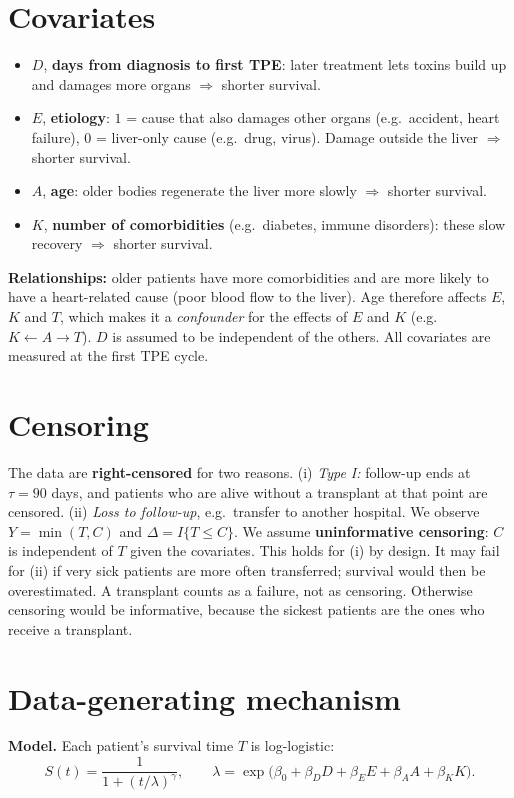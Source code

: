 \documentclass[10pt,a4paper]{article}
\begin{document}
\section{Covariates}
\begin{itemize}
\item $D$, \textbf{days from diagnosis to first TPE}: later treatment lets toxins build up and damages more organs $\Rightarrow$ shorter survival.
\item $E$, \textbf{etiology}: $1$ = cause that also damages other organs (e.g.\ accident, heart failure), $0$ = liver-only cause (e.g.\ drug, virus). Damage outside the liver $\Rightarrow$ shorter survival.
\item $A$, \textbf{age}: older bodies regenerate the liver more slowly $\Rightarrow$ shorter survival.
\item $K$, \textbf{number of comorbidities} (e.g.\ diabetes, immune disorders): these slow recovery $\Rightarrow$ shorter survival.
\end{itemize}
\textbf{Relationships:} older patients have more comorbidities and are more likely to have a heart-related cause (poor blood flow to the liver). Age therefore affects $E$, $K$ and $T$, which makes it a \emph{confounder} for the effects of $E$ and $K$ (e.g.\ $K\leftarrow A\rightarrow T$). $D$ is assumed to be independent of the others. All covariates are measured at the first TPE cycle.

\section{Censoring}
The data are \textbf{right-censored} for two reasons. (i) \emph{Type I:} follow-up ends at $\tau=90$ days, and patients who are alive without a transplant at that point are censored. (ii) \emph{Loss to follow-up}, e.g.\ transfer to another hospital. We observe $Y=\min(T,C)$ and $\Delta=I\{T\le C\}$.
We assume \textbf{uninformative censoring}: $C$ is independent of $T$ given the covariates. This holds for (i) by design. It may fail for (ii) if very sick patients are more often transferred; survival would then be overestimated. A transplant counts as a failure, not as censoring. Otherwise censoring would be informative, because the sickest patients are the ones who receive a transplant.

\section{Data-generating mechanism}
\textbf{Model.} Each patient's survival time $T$ is log-logistic:
\vspace{-4pt}
\[
S(t)=\frac{1}{1+(t/\lambda)^{\gamma}},\qquad \lambda=\exp\big(\beta_0+\beta_D D+\beta_E E+\beta_A A+\beta_K K\big).
\]
\vspace{-10pt}
\end{document}
